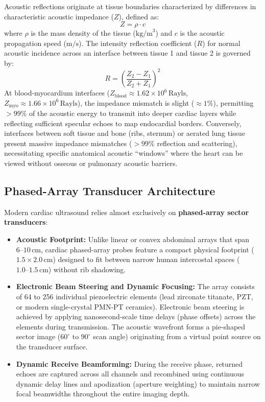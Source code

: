 \documentclass[11pt,a4paper]{article}
\begin{document}
Acoustic reflections originate at tissue boundaries characterized by differences in characteristic acoustic impedance ($Z$), defined as:
\begin{equation}
    Z = \rho \cdot c
\end{equation}
where $\rho$ is the mass density of the tissue ($\text{kg/m}^3$) and $c$ is the acoustic propagation speed ($\text{m/s}$). The intensity reflection coefficient ($R$) for normal acoustic incidence across an interface between tissue 1 and tissue 2 is governed by:
\begin{equation}
    R = \left( \frac{Z_2 - Z_1}{Z_2 + Z_1} \right)^2
\end{equation}
At blood-myocardium interfaces ($Z_{\text{blood}} \approx 1.62 \times 10^6\,\text{Rayls}$, $Z_{\text{myo}} \approx 1.66 \times 10^6\,\text{Rayls}$), the impedance mismatch is slight ($\approx 1\%$), permitting $> 99\%$ of the acoustic energy to transmit into deeper cardiac layers while reflecting sufficient specular echoes to map endocardial borders. Conversely, interfaces between soft tissue and bone (ribs, sternum) or aerated lung tissue present massive impedance mismatches ($> 99\%$ reflection and scattering), necessitating specific anatomical acoustic ``windows'' where the heart can be viewed without osseous or pulmonary acoustic barriers.

\subsection{Phased-Array Transducer Architecture}

Modern cardiac ultrasound relies almost exclusively on \textbf{phased-array sector transducers}:
\begin{itemize}[leftmargin=*]
    \item \textbf{Acoustic Footprint:} Unlike linear or convex abdominal arrays that span $6\text{--}10\,\text{cm}$, cardiac phased-array probes feature a compact physical footprint ($1.5 \times 2.0\,\text{cm}$) designed to fit between narrow human intercostal spaces ($1.0\text{--}1.5\,\text{cm}$) without rib shadowing.
    \item \textbf{Electronic Beam Steering and Dynamic Focusing:} The array consists of 64 to 256 individual piezoelectric elements (lead zirconate titanate, PZT, or modern single-crystal PMN-PT ceramics). Electronic beam steering is achieved by applying nanosecond-scale time delays (phase offsets) across the elements during transmission. The acoustic wavefront forms a pie-shaped sector image ($60^\circ\text{ to }90^\circ$ scan angle) originating from a virtual point source on the transducer surface.
    \item \textbf{Dynamic Receive Beamforming:} During the receive phase, returned echoes are captured across all channels and recombined using continuous dynamic delay lines and apodization (aperture weighting) to maintain narrow focal beamwidths throughout the entire imaging depth.
\end{itemize}
\end{document}

